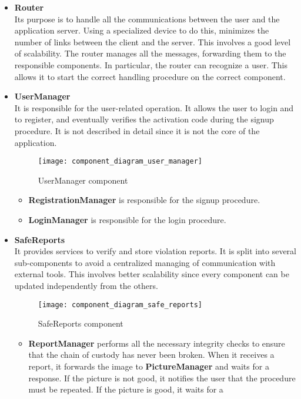 \documentclass[./main.tex]{subfiles}
\begin{document}
\begin{itemize}
\item
  \textbf{Router}\\
  Its purpose is to handle all the communications between the user and the
  application server. Using a specialized device to do this, minimizes the
  number of links between the client and the server. This involves a good level
  of scalability. The router manages all the messages, forwarding them to the
  responsible components. In particular, the router can recognize a user. This
  allows it to start the correct handling procedure on the correct component.
\item
  \textbf{UserManager}\\
  It is responsible for the user-related operation. It allows the user to login
  and to register, and eventually verifies the activation code during the
  signup procedure. It is not described in detail since it is not the core of
  the application.
  \begin{figure}[H]
  \centering
  \texttt{[image: component\_diagram\_user\_manager]}
  \caption{UserManager component}
  \end{figure}
  \begin{itemize}
  \item
    \textbf{RegistrationManager} is responsible for the signup procedure.
  \item
    \textbf{LoginManager} is responsible for the login procedure.
  \end{itemize}
\item
  \textbf{SafeReports}\\
  It provides services to verify and store violation reports. It is split into
  several sub-components to avoid a centralized managing of communication with
  external tools. This involves better scalability since every component can be
  updated independently from the others.
  \begin{figure}[H]
  \centering
  \texttt{[image: component\_diagram\_safe\_reports]}
  \caption{SafeReports component}
  \end{figure}
  \begin{itemize}
  \item
    \textbf{ReportManager} performs all the necessary integrity checks to
    ensure that the chain of custody has never been broken. When it receives a
    report, it forwards the image to \textbf{PictureManager} and waits for a
    response. If the picture is not good, it notifies the user that the
    procedure must be repeated. If the picture is good, it waits for a

\end{itemize}
\end{itemize}
\end{document}
